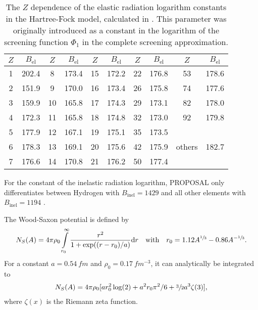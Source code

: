 \begin{table}
    \caption{The $Z$ dependence of the elastic radiation logarithm constants in the Hartree-Fock model, calculated in \cite{Kelner99RadLog}. This parameter was originally introduced as a constant in the logarithm of the screening function $\Phi_1$ in the complete screening approximation.}
    \label{tab:rad_log}
    \begin{center}
    \begin{tabular}{cc|cc|cc|cc|cc}
        \toprule
        $Z$ & $B_{\text{el}}$ & $Z$ & $B_{\text{el}}$ & $Z$ & $B_{\text{el}}$ & $Z$ & $B_{\text{el}}$ & $Z$ & $B_{\text{el}}$ \\
        \midrule
        1 & 202.4 & 8 & 173.4 & 15 & 172.2 & 22 & 176.8 & 53 & 178.6 \\
        2 & 151.9 & 9 & 170.0 & 16 & 173.4 & 26 & 175.8 & 74 & 177.6 \\
        3 & 159.9 & 10 & 165.8 & 17 & 174.3 & 29 & 173.1 & 82 & 178.0 \\
        4 & 172.3 & 11 & 165.8 & 18 & 174.8 & 32 & 173.0 & 92 & 179.8 \\
        5 & 177.9 & 12 & 167.1 & 19 & 175.1 & 35 & 173.5 & & \\
        6 & 178.3 & 13 & 169.1 & 20 & 175.6 & 42 & 175.9 & others & 182.7 \\
        7 & 176.6 & 14 & 170.8 & 21 & 176.2 & 50 & 177.4 & & \\
        \bottomrule
    \end{tabular}
    \end{center}
\end{table}
For the constant of the inelastic radiation logarithm, PROPOSAL only differentiates between Hydrogen with $B_{\text{inel}} = 1429$ and all other elements with $B_{\text{inel}} = 1194$ \cite{Tsai74}.

The Wood-Saxon potential is defined by \cite{Butkevich02}
\begin{align}
    N_S(A) = 4 \pi \rho_0 \int\limits_{r_0}^{\infty} \frac{r^2}{1+\exp((r-r_0)/a)} \mathrm{d} r
    \quad \text{with} \quad
    r_0 = 1.12 A^{\sfrac13} - 0.86 A^{-\sfrac13} .
\end{align}
For a constant $a = \SI{0.54}{fm}$ and $\rho_0 = \SI{0.17}{fm^{-3}}$, it can analytically be integrated to
\begin{align}
    N_S(A) = 4 \pi \rho_0 [a r_0^2\log(2) + a^2 r_0 \pi^2 / 6 + \sfrac32 a^3 \zeta(3)] ,
\end{align}
where $\zeta(x)$ is the Riemann zeta function.


